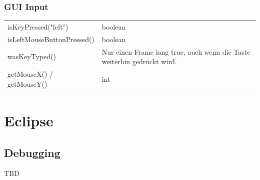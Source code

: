 \documentclass[12pt,a4paper]{article}
\begin{document}
\subsubsection*{GUI Input}
\begin{tabularx}{\linewidth}{l X}
isKeyPressed("left") & boolean\\
isLeftMouseButtonPressed() & boolean\\
wasKeyTyped() & Nur einen Frame lang true, auch wenn die Taste weiterhin gedrückt wird.\\
getMouseX() / getMouseY() & int
\end{tabularx}
\newpage
\section{Eclipse}
\subsection{Debugging}
TBD %
\end{document}

